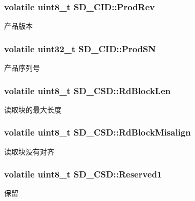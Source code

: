 \subsubsection[{\texorpdfstring{Prod\+Rev}{ProdRev}}]{\setlength{\rightskip}{0pt plus 5cm}volatile uint8\+\_\+t S\+D\+\_\+\+C\+I\+D\+::\+Prod\+Rev}\hypertarget{group__sd__card_ga3c9906d1956b15f7e333323af56fe052}{}\label{group__sd__card_ga3c9906d1956b15f7e333323af56fe052}
产品版本 
\subsubsection[{\texorpdfstring{Prod\+SN}{ProdSN}}]{\setlength{\rightskip}{0pt plus 5cm}volatile uint32\+\_\+t S\+D\+\_\+\+C\+I\+D\+::\+Prod\+SN}\hypertarget{group__sd__card_gadc2afe7dd7073a844eaebb4bd4449abb}{}\label{group__sd__card_gadc2afe7dd7073a844eaebb4bd4449abb}
产品序列号 
\subsubsection[{\texorpdfstring{Rd\+Block\+Len}{RdBlockLen}}]{\setlength{\rightskip}{0pt plus 5cm}volatile uint8\+\_\+t S\+D\+\_\+\+C\+S\+D\+::\+Rd\+Block\+Len}\hypertarget{group__sd__card_ga03458802593a7d3eeffa8518b204ba73}{}\label{group__sd__card_ga03458802593a7d3eeffa8518b204ba73}
读取块的最大长度 
\subsubsection[{\texorpdfstring{Rd\+Block\+Misalign}{RdBlockMisalign}}]{\setlength{\rightskip}{0pt plus 5cm}volatile uint8\+\_\+t S\+D\+\_\+\+C\+S\+D\+::\+Rd\+Block\+Misalign}\hypertarget{group__sd__card_ga897fc62e6505259c20ac4490a589a09c}{}\label{group__sd__card_ga897fc62e6505259c20ac4490a589a09c}
读取块没有对齐 
\subsubsection[{\texorpdfstring{Reserved1}{Reserved1}}]{\setlength{\rightskip}{0pt plus 5cm}volatile uint8\+\_\+t S\+D\+\_\+\+C\+S\+D\+::\+Reserved1}\hypertarget{group__sd__card_gab7c521a48dcc810a5b1b76278d5bebb2}{}\label{group__sd__card_gab7c521a48dcc810a5b1b76278d5bebb2}
保留 
